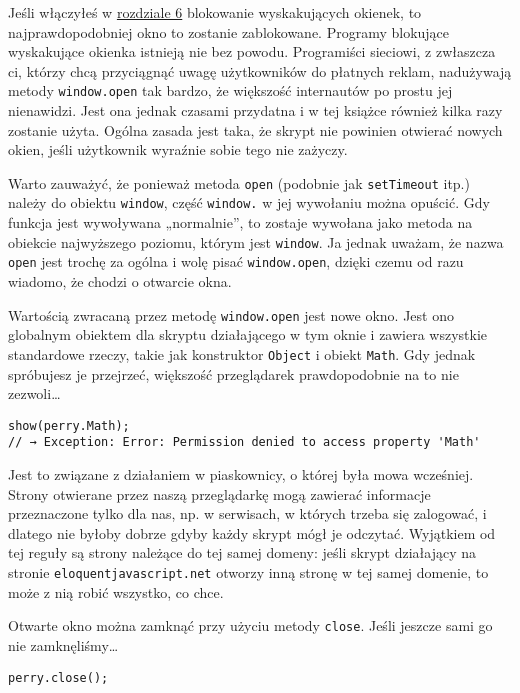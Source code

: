 Jeśli włączyłeś w \hyperref[chap:6]{rozdziale 6} blokowanie wyskakujących okienek, to najprawdopodobniej okno to zostanie zablokowane. Programy blokujące wyskakujące okienka istnieją nie bez powodu. Programiści sieciowi, z zwłaszcza ci, którzy chcą przyciągnąć uwagę użytkowników do płatnych reklam, nadużywają metody \texttt{window.open} tak bardzo, że większość internautów po prostu jej nienawidzi. Jest ona jednak czasami przydatna i w tej książce również kilka razy zostanie użyta. Ogólna zasada jest taka, że skrypt nie powinien otwierać nowych okien, jeśli użytkownik wyraźnie sobie tego nie zażyczy.

  
Warto zauważyć, że ponieważ metoda \texttt{open} (podobnie jak \texttt{setTimeout} itp.) należy do obiektu \texttt{window}, część \texttt{window.} w jej wywołaniu można opuścić. Gdy funkcja jest wywoływana „normalnie”, to zostaje wywołana jako metoda na obiekcie najwyższego poziomu, którym jest \texttt{window}. Ja jednak uważam, że nazwa \texttt{open} jest trochę za ogólna i wolę pisać \texttt{window.open}, dzięki czemu od razu wiadomo, że chodzi o otwarcie okna.

  
Wartością zwracaną przez metodę \texttt{window.open} jest nowe okno. Jest ono globalnym obiektem dla skryptu działającego w tym oknie i zawiera wszystkie standardowe rzeczy, takie jak konstruktor \texttt{Object} i obiekt \texttt{Math}. Gdy jednak spróbujesz je przejrzeć, większość przeglądarek prawdopodobnie na to nie zezwoli…

  
\begin{verbatim} 
show(perry.Math);
// → Exception: Error: Permission denied to access property 'Math'
\end{verbatim}
  
Jest to związane z działaniem w piaskownicy, o której była mowa wcześniej. Strony otwierane przez naszą przeglądarkę mogą zawierać informacje przeznaczone tylko dla nas, np. w serwisach, w których trzeba się zalogować, i dlatego nie byłoby dobrze gdyby każdy skrypt mógł je odczytać. Wyjątkiem od tej reguły są strony należące do tej samej domeny: jeśli skrypt działający na stronie \texttt{eloquentjavascript.net} otworzy inną stronę w tej samej domenie, to może z nią robić wszystko, co chce.

  
Otwarte okno można zamknąć przy użyciu metody \texttt{close}. Jeśli jeszcze sami go nie zamknęliśmy…

  
\begin{verbatim} 
perry.close();
\end{verbatim}
  
